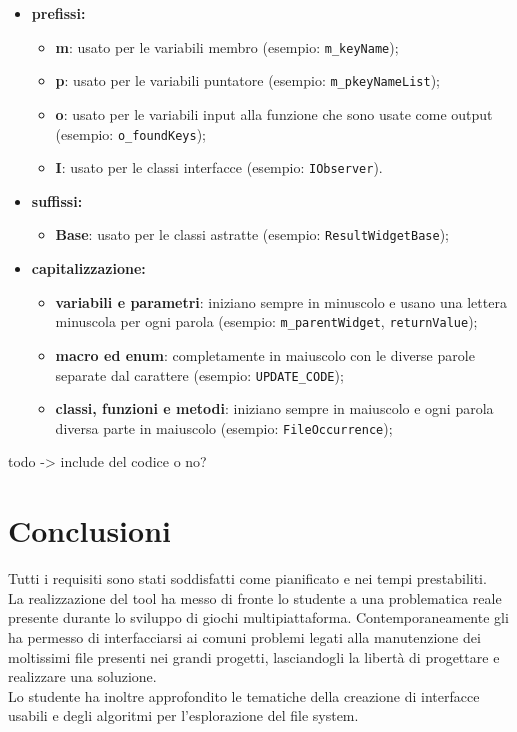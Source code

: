 \begin{itemize}
	\item \textbf{prefissi:}
	\begin{itemize}
		\item \textbf{m}: usato per le variabili membro (esempio: \texttt{m\_keyName});
		\item \textbf{p}: usato per le variabili puntatore (esempio: \texttt{m\_pkeyNameList});
		\item \textbf{o}: usato per le variabili input alla funzione che sono usate come output (esempio: \texttt{o\_foundKeys});
		\item \textbf{I}: usato per le classi interfacce (esempio: \texttt{IObserver}).
	\end{itemize}
	\item \textbf{suffissi:}
	\begin{itemize}
		\item \textbf{Base}: usato per le classi astratte (esempio: \texttt{ResultWidgetBase});
	\end{itemize}
	\item \textbf{capitalizzazione:}
	\begin{itemize}
		\item \textbf{variabili e parametri}: iniziano sempre in minuscolo e usano una lettera minuscola per ogni parola (esempio: \texttt{m\_parentWidget}, \texttt{returnValue});
		\item \textbf{macro ed enum}: completamente in maiuscolo con le diverse parole separate dal carattere \sq{\_} (esempio: \texttt{UPDATE\_CODE});
		\item \textbf{classi, funzioni e metodi}: iniziano sempre in maiuscolo e ogni parola diversa parte in maiuscolo (esempio: \texttt{FileOccurrence});
	\end{itemize}
\end{itemize}

todo -> include del codice o no?

\section{Conclusioni}
Tutti i requisiti sono stati soddisfatti come pianificato e nei tempi prestabiliti.\\
La realizzazione del tool ha messo di fronte lo studente a una problematica reale presente durante lo sviluppo di giochi multipiattaforma. Contemporaneamente gli ha permesso di interfacciarsi ai comuni problemi legati alla manutenzione dei moltissimi file presenti nei grandi progetti, lasciandogli la libertà di progettare e realizzare una soluzione.\\
Lo studente ha inoltre approfondito le tematiche della creazione di interfacce usabili e degli algoritmi per l'esplorazione del file system.